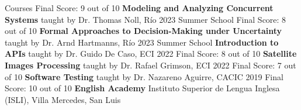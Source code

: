 \begin{rubric}{Courses}
    \newline Final Score: 9 out of 10
\entry*[Feb. 2023] 
    \textbf{Modeling and Analyzing Concurrent Systems}
    \newline taught by Dr. Thomas Noll, Río 2023 Summer School
    \newline Final Score: 8 out of 10
\entry*[Feb. 2023] 
    \textbf{Formal Approaches to Decision-Making under Uncertainty}
    \newline taught by Dr. Arnd Hartmanns, Río 2023 Summer School
\entry*[Aug. 2022] 
    \textbf{Introduction to APIs}
    \newline taught by Dr. Guido De Caso, ECI 2022
    \newline Final Score: 8 out of 10
\entry*[Aug. 2022] 
    \textbf{Satellite Images Processing}
    \newline taught by Dr. Rafael Grimson, ECI 2022
    \newline Final Score: 7 out of 10
\entry*[Oct. 2019] 
    \textbf{Software Testing}
    \newline taught by Dr. Nazareno Aguirre, CACIC 2019
    \newline Final Score: 10 out of 10
\entry*[2011--2016] 
    \textbf{English Academy} 
    \newline Instituto Superior de Lengua Inglesa (ISLI), Villa Mercedes, San Luis

\end{rubric}